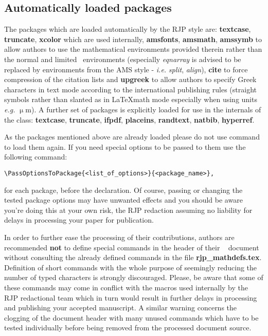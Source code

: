 \documentclass[myclassdoc,debug]{rjparticle}
\begin{document}
\subsection{Automatically loaded packages}

The packages which are loaded automatically by the RJP style are:  \textbf{textcase}, \textbf{truncate}, \textbf{xcolor} which are used internally, \textbf{amsfonts}, \textbf{amsmath}, \textbf{amssymb} to allow authors to use the mathematical environments provided therein rather than the normal and limited \LaTeXe ~environments (especially \textit{eqnarray} is advised to be replaced by environments from the AMS style - \textit{i.e.} \textit{split}, \textit{align}), \textbf{cite} to force compression of the citation lists and \textbf{upgreek} to allow authors to specify Greek characters in text mode according to the international publishing rules (straight symbols rather than slanted as in \LaTeX math mode especially when using units \textit{e.g.} $\upmu$m). A further set of packages is explicitly loaded for use in the internals of the class: \textbf{textcase}, \textbf{truncate}, \textbf{ifpdf}, \textbf{placeins}, \textbf{randtext}, \textbf{natbib}, \textbf{hyperref}.

As the packages mentioned above are already loaded please do not use \linebreak {} command to load them again. If you need special options to be passed to them use the following command:
\begin{lstlisting}
\PassOptionsToPackage{<list_of_options>}{<package_name>},
\end{lstlisting}
for each package, before the {\small {}} declaration. Of course, passing or changing the tested package options may have unwanted effects and you should be aware you're doing this at your own risk, the RJP redaction assuming no liability for delays in processing your paper for publication.

In order to further ease the processing of their contributions, authors are recommended {\bf not} to define special commands in the header of their \LaTeXe~ document without consulting the already defined commands in the file \textbf{rjp\_mathdefs.tex}. Definition of short commands with the whole purpose of seemingly reducing the number of typed characters is strongly discouraged. Please, be aware that some of these commands may come in conflict with the macros used internally by the RJP redactional team which in turn would result in further delays in processing and publishing your accepted manuscript. A similar warning concerns the clogging of the document header with many unused commands which have to be tested individually before being removed from the processed document source.
\end{document}
